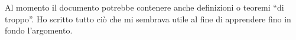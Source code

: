 \documentclass[12pt]{report}
\theoremstyle{definition}
\theoremstyle{plain}
\begin{document}


\tableofcontents

Al momento il documento potrebbe contenere anche definizioni o teoremi “di troppo”. Ho scritto tutto ciò che mi sembrava utile al fine di apprendere fino in fondo l'argomento.







% 



\end{document}
